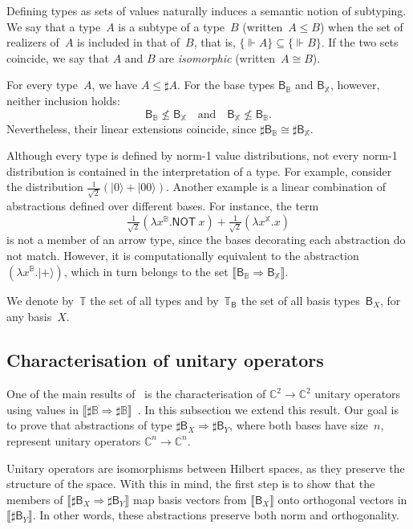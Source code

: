 \documentclass[runningheads,orivec,envcountsame,envcountsect]{llncs}
\newcommand\ket[1]{\ensuremath{|#1\rangle}}
\def\C{\mathbb{C}}            %
\def\Lam#1#2#3{\lambda#1^{#2}{.}#3} %
\def\Arr{\Rightarrow}
\def\Type{\mathbb{T}}
\def\BasisType{\Type_{\basis{}}}
\def\sem#1{\llbracket#1\rrbracket}
\def\real{\Vdash}
\newcommand\B{\mathbb B}
\newcommand\XB{\mathbb X}
\newcommand{\pauliX}[1]{\mathsf{NOT}\ #1}
\newcommand\basis[1]{\ensuremath{\mathsf{B}_{#1}}}
\begin{document}
Defining types as sets of values naturally induces a semantic notion of
subtyping. We say that a type~$A$ is a subtype of a type~$B$
(written~$A\leq B$) when the set of realizers of~$A$ is included in that of~$B$,
that is, $\{\real A\}\subseteq\{\real B\}$.
If the two sets coincide, we say that $A$ and $B$ are \emph{isomorphic}
(written~$A\cong B$).

\begin{example}
  For every type~$A$, we have $A\leq\sharp A$.
  For the base types $\basis{\B}$ and $\basis{\XB}$, however,
  neither inclusion holds:
  \[
    \basis{\B}\not\leq\basis{\XB}
    \quad\text{and}\quad
    \basis{\XB}\not\leq\basis{\B}.
  \]
  Nevertheless, their linear extensions coincide,
  since $\sharp\basis{\B}\cong\sharp\basis{\XB}$.
\end{example}

Although every type is defined by norm-1 value distributions, not every
norm-1 distribution is contained in the interpretation of a type.
For example, consider the distribution
$\tfrac{1}{\sqrt{2}}(\ket{0} + \ket{00})$.
Another example is a linear combination of abstractions defined over different
bases. For instance, the term
\[
  \tfrac{1}{\sqrt{2}}(\Lam{x}{\B}{\pauliX{x}})
  + \tfrac{1}{\sqrt{2}}(\Lam{x}{\XB}{x})
\]
is not a member of an arrow type, since the bases decorating each abstraction
do not match. However, it is computationally equivalent to the abstraction
$(\Lam{x}{\B}{\ket{+}})$, which in turn belongs to the set
$\sem{\basis{\B}\Arr\basis{\XB}}$.


We denote by~$\Type$ the set of all types and by~$\BasisType$ the set of all
basis types~$\basis{X}$, for any basis~$X$.

\subsection{Characterisation of unitary operators}


One of the main results of~\cite{DiazcaroGuillermoMiquelValironLICS19}
is the characterisation of $\C^2\to\C^2$ unitary operators using values in
$\sem{\sharp\B\Arr\sharp\B}$~\cite[Theorem IV.12]{DiazcaroGuillermoMiquelValironLICS19}.
In this subsection we extend this result. Our goal is to prove that abstractions
of type $\sharp\basis{X}\Arr\sharp\basis{Y}$, where both bases have size~$n$,
represent unitary operators
$\C^n\to\C^n$.

Unitary operators are isomorphisms between Hilbert spaces, as they preserve the
structure of the space. With this in mind, the first step is to show that the
members of $\sem{\sharp\basis{X}\Arr\sharp\basis{Y}}$ map basis vectors from
$\sem{\basis{X}}$ onto orthogonal vectors in $\sem{\sharp\basis{Y}}$. In other
words, these abstractions preserve both norm and orthogonality.
\end{document}
